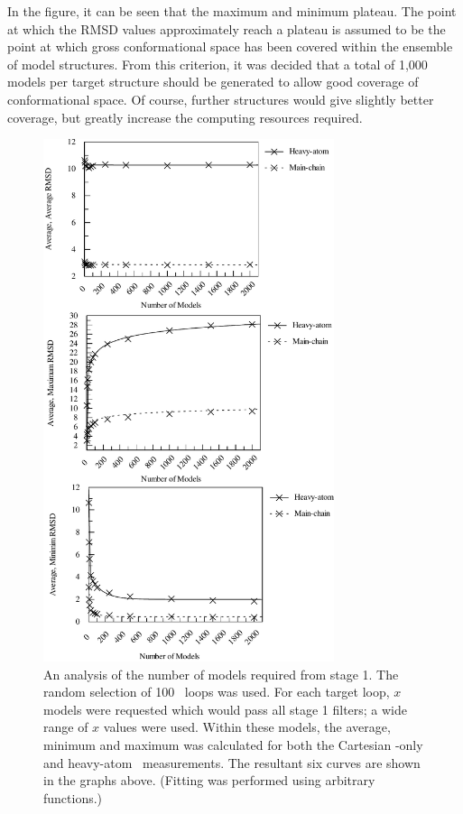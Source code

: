 In the figure, it can be seen that the maximum and minimum plateau. The point at which the RMSD values approximately reach a plateau is assumed to be the point at which gross conformational space has been covered within the ensemble of model structures. From this criterion, it was decided that a total of 1,000 models per target structure should be generated to allow good coverage of conformational space. Of course, further structures would give slightly better coverage, but greatly increase the computing resources required.
\begin{figure}[hbtp]
\begin{center}
\includegraphics[width=0.76\textwidth]{./09-Arcus/num_mod/num_mod.pdf}
\caption[An analysis of the number of models required from stage 1]{An analysis of the number of models required from stage 1. The random selection of 100  \thothloopdb\ loops was used. For each target loop, $x$ models were requested which would pass all stage 1 filters; a wide range of $x$ values were used. Within these models, the average, minimum and maximum was calculated for both the Cartesian \mainchain -only and heavy-atom \crms\ measurements. The resultant six curves are shown in the graphs above. (Fitting was performed using arbitrary functions.)}
\label{fig:arcus:optnummodel}
\end{center}
\end{figure}

